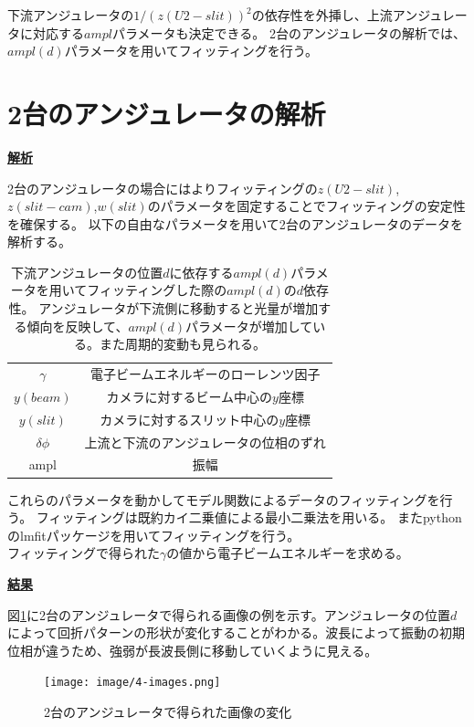 \documentclass[a4paper,11pt,uplatex]{jsbook}
\begin{document}
下流アンジュレータの$1/(z(U2-slit))^2$の依存性を外挿し、上流アンジュレータに対応する$ampl$パラメータも決定できる。
2台のアンジュレータの解析では、$ampl(d)$パラメータを用いてフィッティングを行う。

\section{2台のアンジュレータの解析}
\noindent \textbf{\underline{解析}}\par
2台のアンジュレータの場合にはよりフィッティングの$z(U2-slit)$,$z(slit-cam)$,$w(slit)$のパラメータを固定することでフィッティングの安定性を確保する。
以下の自由なパラメータを用いて2台のアンジュレータのデータを解析する。
\begin{table}[h]
\centering
\begin{tabular}{cc}
  $\gamma$ & 電子ビームエネルギーのローレンツ因子 \\
  $y(beam)$ & カメラに対するビーム中心の$y$座標 \\
  $y(slit)$ & カメラに対するスリット中心の$y$座標 \\
  $\delta \phi$ & 上流と下流のアンジュレータの位相のずれ\\
  ampl & 振幅
\end{tabular}
\caption[位置に依存する振幅パラメータによるフィッティング]{下流アンジュレータの位置$d$に依存する$ampl(d)$パラメータを用いてフィッティングした際の$ampl(d)$の$d$依存性。
アンジュレータが下流側に移動すると光量が増加する傾向を反映して、$ampl(d)$パラメータが増加している。また周期的変動も見られる。}
\end{table}

これらのパラメータを動かしてモデル関数によるデータのフィッティングを行う。
フィッティングは既約カイ二乗値による最小二乗法を用いる。
またpythonのlmfitパッケージ\cite{lmfit}を用いてフィッティングを行う。\\
フィッティングで得られた$\gamma$の値から電子ビームエネルギーを求める。

\noindent \textbf{\underline{結果}}\par
図\ref{images}に2台のアンジュレータで得られる画像の例を示す。アンジュレータの位置$d$によって回折パターンの形状が変化することがわかる。波長によって振動の初期位相が違うため、強弱が長波長側に移動していくように見える。
\begin{figure}[h]
  \centering
  \texttt{[image: image/4-images.png]}
  \caption[干渉による画像の変化]{2台のアンジュレータで得られた画像の変化}\label{images}
\end{figure}
\end{document}
